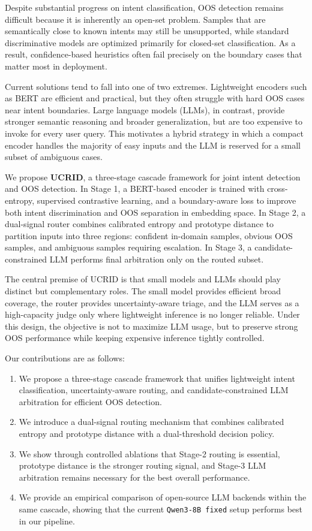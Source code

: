 \documentclass[11pt]{article}
\begin{document}
Despite substantial progress on intent classification, OOS detection remains difficult because it is inherently an open-set problem. Samples that are semantically close to known intents may still be unsupported, while standard discriminative models are optimized primarily for closed-set classification. As a result, confidence-based heuristics often fail precisely on the boundary cases that matter most in deployment.

Current solutions tend to fall into one of two extremes. Lightweight encoders such as BERT are efficient and practical, but they often struggle with hard OOS cases near intent boundaries. Large language models (LLMs), in contrast, provide stronger semantic reasoning and broader generalization, but are too expensive to invoke for every user query. This motivates a hybrid strategy in which a compact encoder handles the majority of easy inputs and the LLM is reserved for a small subset of ambiguous cases.

We propose \textbf{UCRID}, a three-stage cascade framework for joint intent detection and OOS detection. In Stage 1, a BERT-based encoder is trained with cross-entropy, supervised contrastive learning, and a boundary-aware loss to improve both intent discrimination and OOS separation in embedding space. In Stage 2, a dual-signal router combines calibrated entropy and prototype distance to partition inputs into three regions: confident in-domain samples, obvious OOS samples, and ambiguous samples requiring escalation. In Stage 3, a candidate-constrained LLM performs final arbitration only on the routed subset.

The central premise of UCRID is that small models and LLMs should play distinct but complementary roles. The small model provides efficient broad coverage, the router provides uncertainty-aware triage, and the LLM serves as a high-capacity judge only where lightweight inference is no longer reliable. Under this design, the objective is not to maximize LLM usage, but to preserve strong OOS performance while keeping expensive inference tightly controlled.

Our contributions are as follows:
\begin{enumerate}
\item We propose a three-stage cascade framework that unifies lightweight intent classification, uncertainty-aware routing, and candidate-constrained LLM arbitration for efficient OOS detection.
\item We introduce a dual-signal routing mechanism that combines calibrated entropy and prototype distance with a dual-threshold decision policy.
\item We show through controlled ablations that Stage-2 routing is essential, prototype distance is the stronger routing signal, and Stage-3 LLM arbitration remains necessary for the best overall performance.
\item We provide an empirical comparison of open-source LLM backends within the same cascade, showing that the current \texttt{Qwen3-8B fixed} setup performs best in our pipeline.
\end{enumerate}
\end{document}
